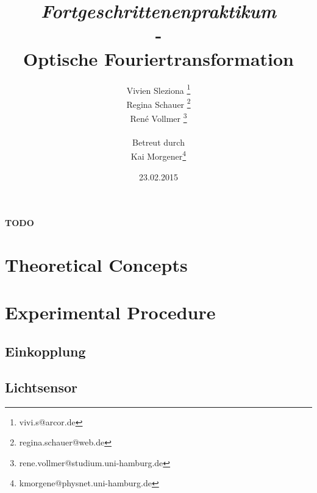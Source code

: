 \documentclass[10pt,a4paper]{article}
\begin{document}
	
	\textbf{TODO}
	
	
	
	\title{\textit{Fortgeschrittenenpraktikum}\\-\\Optische Fouriertransformation }
	\date{23.02.2015}
	\author{Vivien Sleziona \footnote{vivi.s@arcor.de}\\ Regina Schauer \footnote{regina.schauer@web.de}\\ René Vollmer \footnote{rene.vollmer@studium.uni-hamburg.de} \\ \\Betreut durch\\ Kai Morgener\footnote{kmorgene@physnet.uni-hamburg.de}}
	
	\maketitle
	
	\begin{center} 
		\bigskip
		\bigskip
		
		\begin{minipage}{0.75\textwidth}
			
		\end{minipage}
	\end{center}
	
	\newpage
	
	\tableofcontents
	\vfill
	\newpage
	\clearpage	
	
	
	\section{Theoretical Concepts}
	
	

	
	\newpage
	\clearpage
	
	\section{Experimental Procedure} %
	\subsection{Einkopplung}
	
	\subsection{Lichtsensor}
	
\end{document}

